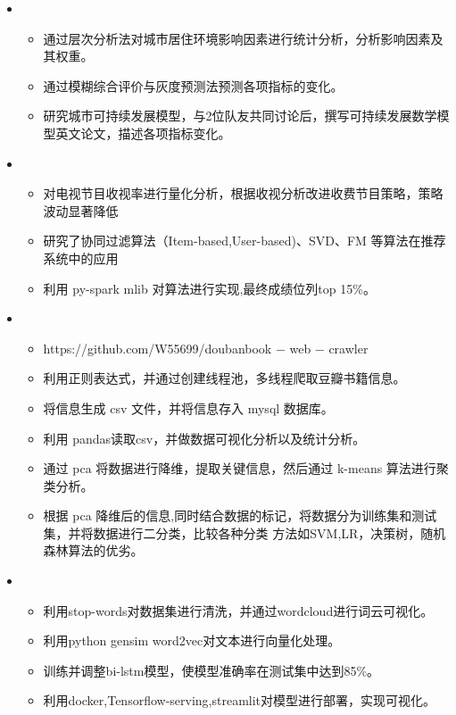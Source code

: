   \begin{itemize}[leftmargin=*]
    \item
      {\small
      \begin{itemize}
      \item 通过层次分析法对城市居住环境影响因素进行统计分析，分析影响因素及其权重。
        \item 通过模糊综合评价与灰度预测法预测各项指标的变化。
        \item 研究城市可持续发展模型，与2位队友共同讨论后，撰写可持续发展数学模型英文论文，描述各项指标变化。
      \end{itemize}
      }
    
    \item
      {\small
      \begin{itemize}
        \item 对电视节目收视率进行量化分析，根据收视分析改进收费节目策略，策略波动显著降低
        \item 研究了协同过滤算法（Item-based,User-based)、SVD、FM 等算法在推荐系统中的应用
        \item 利用 py-spark mlib 对算法进行实现,最终成绩位列top 15\%。
      \end{itemize}
      }


    \item
      {\small
      \begin{itemize}
       \item https://github.com/W55699/doubanbook − web − crawler
       \item 利用正则表达式，并通过创建线程池，多线程爬取豆瓣书籍信息。
       \item 将信息生成 csv 文件，并将信息存入 mysql 数据库。
       \item 利用 pandas读取csv，并做数据可视化分析以及统计分析。
       \item 通过 pca 将数据进行降维，提取关键信息，然后通过 k-means 算法进行聚类分析。 
       \item 根据 pca 降维后的信息,同时结合数据的标记，将数据分为训练集和测试集，并将数据进行二分类，比较各种分类
             方法如SVM,LR，决策树，随机森林算法的优劣。
      \end{itemize}
      }
    \item
      {\small
      \begin{itemize}
      
       \item 利用stop-words对数据集进行清洗，并通过wordcloud进行词云可视化。
       \item 利用python gensim word2vec对文本进行向量化处理。
       \item 训练并调整bi-lstm模型，使模型准确率在测试集中达到85\%。
       \item 利用docker,Tensorflow-serving,streamlit对模型进行部署，实现可视化。
      \end{itemize}
      }


  \end{itemize}
